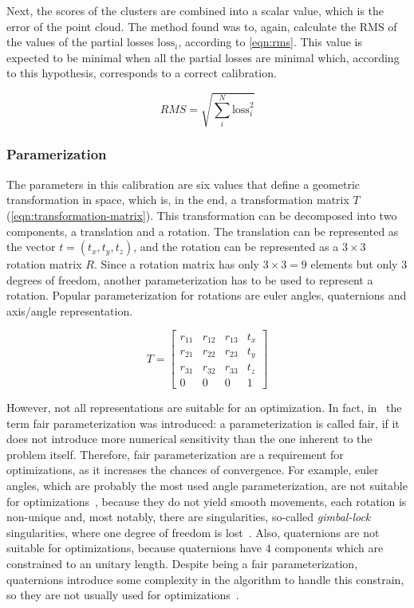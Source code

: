 \documentclass[conference]{IEEEtran}
\begin{document}
Next, the scores of the clusters are combined into a scalar value, which is the error of the point cloud. The method found was to, again, calculate the RMS of the values of the partial losses $\textrm{loss}_i$, according to \cref{eqn:rms}. This value is expected to be minimal when all the partial losses are minimal which, according to this hypothesis, corresponds to a correct calibration.

\begin{equation}
    \label{eqn:rms}
    RMS = \sqrt{\sum_{i}^{N}{\textrm{loss}_i^2}}
\end{equation}

\subsubsection{Paramerization}

The parameters in this calibration are six values that define a geometric transformation in space, which is, in the end, a transformation matrix $T$ (\cref{eqn:transformation-matrix}). This transformation can be decomposed into two components, a translation and a rotation. The translation can be represented as the vector $t = (t_x, t_y, t_z)$, and the rotation can be represented as a $3 \times 3$ rotation matrix $R$. Since a rotation matrix has only $3 \times 3 = 9$ elements but only 3 degrees of freedom, another parameterization has to be used to represent a rotation. Popular parameterization for rotations are euler angles, quaternions and axis/angle representation. 

\begin{equation}
    \label{eqn:transformation-matrix}
    T = \left[
        \begin{array}{cccc}
            r_{11} & r_{12} & r_{13} & t_x \\
            r_{21} & r_{22} & r_{23} & t_y \\
            r_{31} & r_{32} & r_{33} & t_z \\
            0      & 0      & 0      & 1   
        \end{array}
    \right]
\end{equation}

However, not all representations are suitable for an optimization. In fact, in~\cite{hornegger99} the term fair parameterization was introduced: a parameterization is called fair, if it does not introduce more numerical sensitivity than the one inherent to the problem itself. Therefore, fair parameterization are a requirement for optimizations, as it increases the chances of convergence. For example, euler angles, which are probably the most used angle parameterization, are not suitable for optimizations~\cite{schmidt01}, because they do not yield smooth movements, each rotation is non-unique and, most notably, there are singularities, so-called \textit{gimbal-lock} singularities, where one degree of freedom is lost~\cite{schmidt01}. Also, quaternions are not suitable for optimizations, because quaternions have $4$ components which are constrained to an unitary length. Despite being a fair parameterization, quaternions introduce some complexity in the algorithm to handle this constrain, so they are not usually used for optimizations~\cite{schmidt01}.
\end{document}
